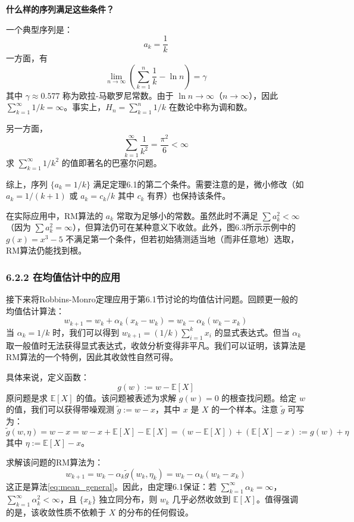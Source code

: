 \documentclass[UTF8]{article}
\begin{document}
\textbf{什么样的序列满足这些条件？}

一个典型序列是：
\[
a_k = \frac{1}{k}
\]
一方面，有
\[
\lim_{n \to \infty} \left( \sum_{k=1}^{n} \frac{1}{k} - \ln n \right) = \gamma
\]
其中 $\gamma \approx 0.577$ 称为欧拉-马歇罗尼常数。由于 $\ln n \to \infty$（$n \to \infty$），因此 $\sum_{k=1}^{\infty} 1/k = \infty$。事实上，$H_n = \sum_{k=1}^{n} 1/k$ 在数论中称为调和数。

另一方面，
\[
\sum_{k=1}^{\infty} \frac{1}{k^2} = \frac{\pi^2}{6} < \infty
\]
求 $\sum_{k=1}^{\infty} 1/k^2$ 的值即著名的巴塞尔问题。

综上，序列 $\{a_k = 1/k\}$ 满足定理6.1的第二个条件。需要注意的是，微小修改（如 $a_k = 1/(k+1)$ 或 $a_k = c_k/k$ 其中 $c_k$ 有界）也保持该条件。

在实际应用中，RM算法的 $a_k$ 常取为足够小的常数。虽然此时不满足 $\sum a_k^2 < \infty$（因为 $\sum a_k^2 = \infty$），但算法仍可在某种意义下收敛。此外，图6.3所示示例中的 $g(x) = x^3 - 5$ 不满足第一个条件，但若初始猜测适当地（而非任意地）选取，RM算法仍能找到根。

\subsubsection*{6.2.2 在均值估计中的应用}

接下来将Robbins-Monro定理应用于第6.1节讨论的均值估计问题。回顾更一般的均值估计算法：
\[
w_{k+1} = w_k + \alpha_k(x_k - w_k) = w_k - \alpha_k(w_k - x_k)
\]
当 $\alpha_k = 1/k$ 时，我们可以得到 $w_{k+1} = (1/k)\sum_{i=1}^{k} x_i$ 的显式表达式。但当 $\alpha_k$ 取一般值时无法获得显式表达式，收敛分析变得非平凡。我们可以证明，该算法是RM算法的一个特例，因此其收敛性自然可得。

具体来说，定义函数：
\[
g(w) := w - \mathbb{E}[X]
\]
原问题是求 $\mathbb{E}[X]$ 的值。该问题被表述为求解 $g(w) = 0$ 的根查找问题。给定 $w$ 的值，我们可以获得带噪观测 $\tilde{g} := w - x$，其中 $x$ 是 $X$ 的一个样本。注意 $\tilde{g}$ 可写为：
\[
\tilde{g}(w, \eta) = w - x = w - x + \mathbb{E}[X] - \mathbb{E}[X] = (w - \mathbb{E}[X]) + (\mathbb{E}[X] - x) := g(w) + \eta
\]
其中 $\eta := \mathbb{E}[X] - x$。

求解该问题的RM算法为：
\[
w_{k+1} = w_k - \alpha_k \tilde{g}(w_k, \eta_k) = w_k - \alpha_k(w_k - x_k)
\]
这正是算法\eqref{eq:mean_general}。因此，由定理6.1保证：若 $\sum_{k=1}^{\infty} \alpha_k = \infty$，$\sum_{k=1}^{\infty} \alpha_k^2 < \infty$，且 $\{x_k\}$ 独立同分布，则 $w_k$ 几乎必然收敛到 $\mathbb{E}[X]$。值得强调的是，该收敛性质不依赖于 $X$ 的分布的任何假设。
\end{document}
